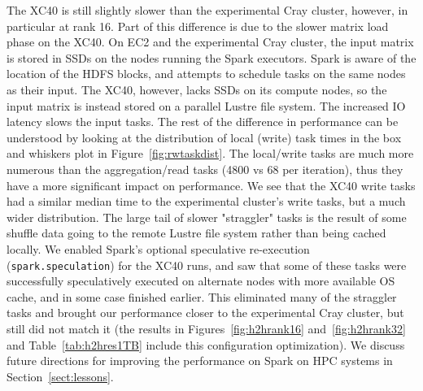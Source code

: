 The XC40 is still slightly slower than the experimental Cray cluster, however, in particular at rank 16.
Part of this difference is due to the slower matrix load phase on the XC40.  On EC2 and the experimental
Cray cluster, the input matrix is stored in SSDs on the nodes running the Spark executors.  Spark is 
aware of the location of the HDFS blocks, and attempts to schedule tasks on the same nodes as their 
input.  The XC40, however, lacks SSDs on its compute nodes, so the input matrix is instead stored on a 
parallel Lustre file system.  The increased IO latency slows the input tasks. The rest of the difference in 
performance can be understood by looking at the distribution of local (write) task times in the box and 
whiskers plot in Figure~\ref{fig:rwtaskdist}.  The local/write tasks are much more numerous than the 
aggregation/read tasks (4800 vs 68 per iteration), thus they have a more significant impact on 
performance. We see that the XC40 write tasks had a similar median time to the experimental cluster's 
write tasks, but a much wider distribution.  The large tail of slower "straggler" tasks is the result of some shuffle data going to the remote Lustre file system rather than being cached locally. We enabled Spark's optional speculative re-execution (\texttt{spark.speculation}) for the XC40 runs, and saw that some of these tasks were successfully speculatively executed on alternate nodes with more available OS cache, and in some case finished earlier.  This eliminated many of the straggler tasks and brought our performance closer to the experimental Cray cluster, but still did not match it (the results in Figures~\ref{fig:h2hrank16} and~\ref{fig:h2hrank32} and Table~\ref{tab:h2hres1TB} include this configuration optimization).  We discuss future directions for improving the performance on Spark on HPC systems in Section~\ref{sect:lessons}.
